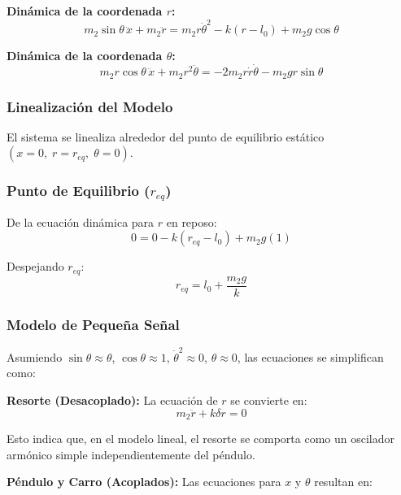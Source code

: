 \documentclass[conference]{IEEEtran}
\begin{document}
\textbf{Dinámica de la coordenada $r$:}
\begin{equation}
m_2\sin\theta\,\ddot{x} + m_2\ddot{r} = m_2r\dot{\theta}^2 - k(r - l_0) + m_2g\cos\theta
\end{equation}

\textbf{Dinámica de la coordenada $\theta$:}
\begin{equation}
m_2r\cos\theta\,\ddot{x} + m_2r^2\ddot{\theta} = -2m_2r\dot{r}\dot{\theta} - m_2gr\sin\theta
\end{equation}

\subsubsection{Linealización del Modelo}

El sistema se linealiza alrededor del punto de equilibrio estático $(x = 0, \; r = r_{eq}, \; \theta = 0)$.

\subsubsection{Punto de Equilibrio ($r_{eq}$)}

De la ecuación dinámica para $r$ en reposo:
\begin{equation}
0 = 0 - k(r_{eq} - l_0) + m_2g(1)
\end{equation}

Despejando $r_{eq}$:
\begin{equation}
r_{eq} = l_0 + \frac{m_2g}{k}
\end{equation}

\subsubsection{Modelo de Pequeña Señal}

Asumiendo $\sin\theta \approx \theta$, $\cos\theta \approx 1$, $\dot{\theta}^2 \approx 0$, $\theta \approx 0$, las ecuaciones se simplifican como:

\textbf{Resorte (Desacoplado):} La ecuación de $r$ se convierte en:
\begin{equation}
m_2\ddot{r} + k\delta r = 0
\end{equation}

Esto indica que, en el modelo lineal, el resorte se comporta como un oscilador armónico simple independientemente del péndulo.

\textbf{Péndulo y Carro (Acoplados):} Las ecuaciones para $x$ y $\theta$ resultan en:
\end{document}
